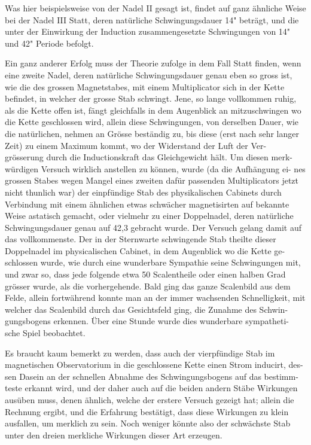 \documentclass[12pt,a4paper]{article}
\begin{document}
Was hier beispielsweise von der Nadel II gesagt ist, findet auf ganz ähnliche 
Weise bei der Nadel III Statt, deren natürliche Schwingungsdauer 14" beträgt, 
und die unter der Einwirkung der Induction zusammengesetzte Schwingungen 
von 14" und 42" Periode befolgt.

Ein ganz anderer Erfolg muss der Theorie zufolge in dem Fall Statt finden, 
wenn eine zweite Nadel, deren natürliche Schwingungsdauer genau eben so gross 
ist, wie die des grossen Magnetstabes, mit einem Multiplicator sich in der Kette 
befindet, in welcher der grosse Stab schwingt. Jene, so lange vollkommen ruhig, 
als die Kette offen ist, fängt gleichfalls in dem Augenblick an mitzuschwingen 
wo die Kette geschlossen wird, allein diese Schwingungen, von derselben Dauer, 
wie die natürlichen, nehmen an Grösse beständig zu, bis diese (erst nach sehr 
langer Zeit) zu einem Maximum kommt, wo der Widerstand der Luft der Ver-
grösserung durch die Inductionskraft das Gleichgewicht hält. Um diesen merk-
würdigen Versuch wirklich anstellen zu können, wurde (da die Aufhängung ei-
nes grossen Stabes wegen Mangel eines zweiten dafür passenden Multiplicators 
jetzt nicht thunlich war) der einpfündige Stab des physikalischen Cabinets durch 
Verbindung mit einem ähnlichen etwas schwächer magnetisirten auf bekannte 
Weise astatisch gemacht, oder vielmehr zu einer Doppelnadel, deren natürliche 
Schwingungsdauer genau auf 42{,}3 gebracht wurde. Der Versuch gelang damit 
auf das vollkommenste. Der in der Sternwarte schwingende Stab theilte dieser 
Doppelnadel im physicalischen Cabinet, in dem Augenblick wo die Kette ge-
schlossen wurde, wie durch eine wunderbare Sympathie seine Schwingungen mit, 
und zwar so, dass jede folgende etwa 50 Scalentheile oder einen halben Grad 
grösser wurde, als die vorhergehende. Bald ging das ganze Scalenbild aus dem 
Felde, allein fortwährend konnte man an der immer wachsenden Schnelligkeit, 
mit welcher das Scalenbild durch das Gesichtsfeld ging, die Zunahme des Schwin-
gungsbogens erkennen. Über eine Stunde wurde dies wunderbare sympatheti-
sche Spiel beobachtet.

Es braucht kaum bemerkt zu werden, dass auch der vierpfündige Stab im 
magnetischen Observatorium in die geschlossene Kette einen Strom inducirt, des-
sen Dasein an der schnellen Abnahme des Schwingungsbogens auf das bestimm-
teste erkannt wird, und der daher auch auf die beiden andern Stäbe Wirkungen 
ausüben muss, denen ähnlich, welche der erstere Versuch gezeigt hat; allein 
die Rechnung ergibt, und die Erfahrung bestätigt, dass diese Wirkungen zu 
klein ausfallen, um merklich zu sein. Noch weniger könnte also der schwächste 
Stab unter den dreien merkliche Wirkungen dieser Art erzeugen.
\end{document}
